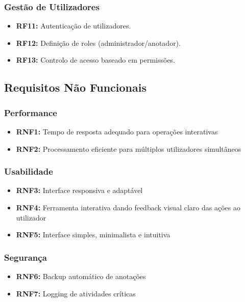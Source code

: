 \subsubsection{Gestão de Utilizadores}

\begin{itemize}
    \item \textbf{RF11:} Autenticação de utilizadores.
    \item \textbf{RF12:} Definição de roles (administrador/anotador).
    \item \textbf{RF13:} Controlo de acesso baseado em permissões.
\end{itemize}

\subsection{Requisitos Não Funcionais}

\subsubsection{Performance}

\begin{itemize}
    \item \textbf{RNF1:} Tempo de resposta adequado para operações interativas
    \item \textbf{RNF2:} Processamento eficiente para múltiplos utilizadores simultâneos
\end{itemize}

\subsubsection{Usabilidade}

\begin{itemize}
    \item \textbf{RNF3:} Interface responsiva e adaptável
    \item \textbf{RNF4:} Ferramenta interativa dando feedback visual claro das ações ao utilizador
    \item \textbf{RNF5:} Interface simples, minimalista e intuitiva
\end{itemize}

\subsubsection{Segurança}

\begin{itemize}
    \item \textbf{RNF6:} Backup automático de anotações
    \item \textbf{RNF7:} Logging de atividades críticas
\end{itemize}

